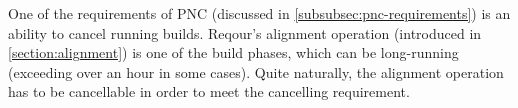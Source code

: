 \documentclass[../main.tex]{subfiles}
\begin{document}
One of the requirements of PNC (discussed in \ref{subsubsec:pnc-requirements}) is an ability to cancel running builds. Reqour's alignment operation (introduced in \ref{section:alignment}) is one of the build phases, which can be long-running (exceeding over an hour in some cases). Quite naturally, the alignment operation has to be cancellable in order to meet the cancelling requirement.
\end{document}
